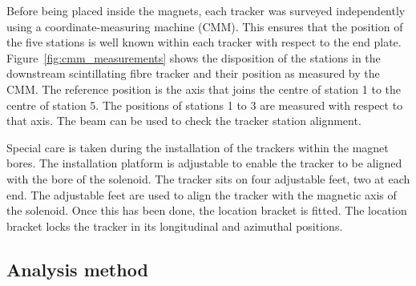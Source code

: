 Before being placed inside the magnets, each tracker was surveyed independently using a coordinate-measuring machine (CMM). This ensures that the position of the five stations is well known within each tracker with respect to the end plate. Figure~\ref{fig:cmm_measurements} shows the disposition of the stations in the downstream scintillating fibre tracker and their position as measured by the CMM. The reference position is the axis that joins the centre of station 1 to the centre of station 5. The positions of stations 1 to 3 are measured with respect to that axis. The beam can be used to check the tracker station alignment.

Special care is taken during the installation of the trackers within the magnet bores. The installation platform is adjustable to enable the tracker to be aligned with the bore of the solenoid. The tracker sits on four adjustable feet, two at each end. The adjustable feet are used to align the tracker with the magnetic axis of the solenoid. Once this has been done, the location bracket is fitted. The location bracket locks the tracker in its longitudinal and azimuthal positions.

\subsection{Analysis method}
\label{SubSect:DA_Analysis}


